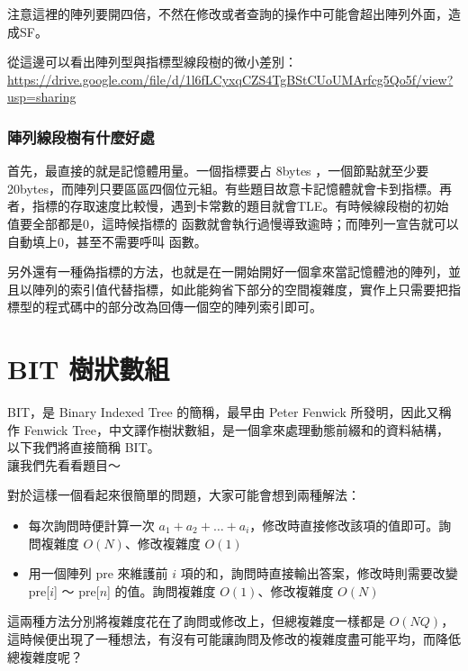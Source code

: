 \documentclass[main.tex]{subfiles}
\begin{document}
注意這裡的陣列要開四倍，不然在修改或者查詢的操作中可能會超出陣列外面，造成SF。


從這邊可以看出陣列型與指標型線段樹的微小差別：\\
\url{https://drive.google.com/file/d/1l6fLCyxqCZS4TgBStCUoUMArfcg5Qo5f/view?usp=sharing}

\subsubsection{陣列線段樹有什麼好處}

首先，最直接的就是記憶體用量。一個指標要占 8bytes ，一個節點就至少要 20bytes，而陣列只要區區四個位元組。有些題目故意卡記憶體就會卡到指標。再者，指標的存取速度比較慢，遇到卡常數的題目就會TLE。有時候線段樹的初始值要全部都是0，這時候指標的  函數就會執行過慢導致逾時；而陣列一宣告就可以自動填上0，甚至不需要呼叫  函數。

另外還有一種偽指標的方法，也就是在一開始開好一個拿來當記憶體池的陣列，並且以陣列的索引值代替指標，如此能夠省下部分的空間複雜度，實作上只需要把指標型的程式碼中的部分改為回傳一個空的陣列索引即可。

\section{BIT 樹狀數組}
	BIT，是 Binary Indexed Tree 的簡稱，最早由 Peter Fenwick 所發明，因此又稱作 Fenwick Tree，中文譯作樹狀數組，是一個拿來處理動態前綴和的資料結構，以下我們將直接簡稱 BIT。\\
	讓我們先看看題目～
\par 對於這樣一個看起來很簡單的問題，大家可能會想到兩種解法：
\begin{itemize}
\item 每次詢問時便計算一次 $a_1 + a_2 + \dots + a_i$，修改時直接修改該項的值即可。詢問複雜度 $O(N)$、修改複雜度 $O(1)$
\item 用一個陣列 pre 來維護前 $i$ 項的和，詢問時直接輸出答案，修改時則需要改變 pre[$i$] ～ pre[$n$] 的值。詢問複雜度 $O(1)$、修改複雜度 $O(N)$
\end{itemize}

\par 這兩種方法分別將複雜度花在了詢問或修改上，但總複雜度一樣都是 $O(NQ)$，這時候便出現了一種想法，有沒有可能讓詢問及修改的複雜度盡可能平均，而降低總複雜度呢？\\
\end{document}
